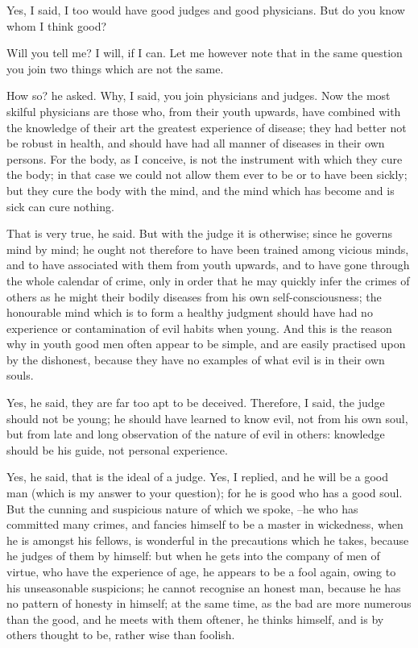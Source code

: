 Yes, I said, I too would have good judges and good physicians. But do you know whom I think good?

Will you tell me?
I will, if I can. Let me however note that in the same question you join two things which are not the same.

How so? he asked.
Why, I said, you join physicians and judges. Now the most skilful physicians are those who, from their youth upwards, have combined with the knowledge of their art the greatest experience of disease; they had better not be robust in health, and should have had all manner of diseases in their own persons. For the body, as I conceive, is not the instrument with which they cure the body; in that case we could not allow them ever to be or to have been sickly; but they cure the body with the mind, and the mind which has become and is sick can cure nothing.

That is very true, he said.
But with the judge it is otherwise; since he governs mind by mind; he ought not therefore to have been trained among vicious minds, and to have associated with them from youth upwards, and to have gone through the whole calendar of crime, only in order that he may quickly infer the crimes of others as he might their bodily diseases from his own self-consciousness; the honourable mind which is to form a healthy judgment should have had no experience or contamination of evil habits when young. And this is the reason why in youth good men often appear to be simple, and are easily practised upon by the dishonest, because they have no examples of what evil is in their own souls.

Yes, he said, they are far too apt to be deceived.
Therefore, I said, the judge should not be young; he should have learned to know evil, not from his own soul, but from late and long observation of the nature of evil in others: knowledge should be his guide, not personal experience.

Yes, he said, that is the ideal of a judge.
Yes, I replied, and he will be a good man (which is my answer to your question); for he is good who has a good soul. But the cunning and suspicious nature of which we spoke, --he who has committed many crimes, and fancies himself to be a master in wickedness, when he is amongst his fellows, is wonderful in the precautions which he takes, because he judges of them by himself: but when he gets into the company of men of virtue, who have the experience of age, he appears to be a fool again, owing to his unseasonable suspicions; he cannot recognise an honest man, because he has no pattern of honesty in himself; at the same time, as the bad are more numerous than the good, and he meets with them oftener, he thinks himself, and is by others thought to be, rather wise than foolish.

